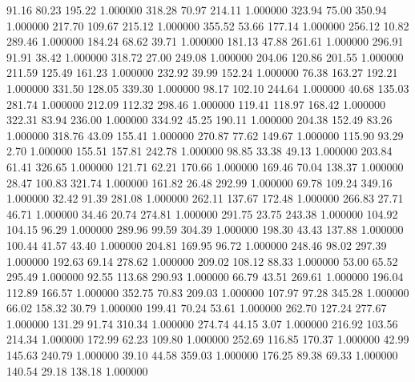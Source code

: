      91.16     80.23    195.22  1.000000
    318.28     70.97    214.11  1.000000
    323.94     75.00    350.94  1.000000
    217.70    109.67    215.12  1.000000
    355.52     53.66    177.14  1.000000
    256.12     10.82    289.46  1.000000
    184.24     68.62     39.71  1.000000
    181.13     47.88    261.61  1.000000
    296.91     91.91     38.42  1.000000
    318.72     27.00    249.08  1.000000
    204.06    120.86    201.55  1.000000
    211.59    125.49    161.23  1.000000
    232.92     39.99    152.24  1.000000
     76.38    163.27    192.21  1.000000
    331.50    128.05    339.30  1.000000
     98.17    102.10    244.64  1.000000
     40.68    135.03    281.74  1.000000
    212.09    112.32    298.46  1.000000
    119.41    118.97    168.42  1.000000
    322.31     83.94    236.00  1.000000
    334.92     45.25    190.11  1.000000
    204.38    152.49     83.26  1.000000
    318.76     43.09    155.41  1.000000
    270.87     77.62    149.67  1.000000
    115.90     93.29      2.70  1.000000
    155.51    157.81    242.78  1.000000
     98.85     33.38     49.13  1.000000
    203.84     61.41    326.65  1.000000
    121.71     62.21    170.66  1.000000
    169.46     70.04    138.37  1.000000
     28.47    100.83    321.74  1.000000
    161.82     26.48    292.99  1.000000
     69.78    109.24    349.16  1.000000
     32.42     91.39    281.08  1.000000
    262.11    137.67    172.48  1.000000
    266.83     27.71     46.71  1.000000
     34.46     20.74    274.81  1.000000
    291.75     23.75    243.38  1.000000
    104.92    104.15     96.29  1.000000
    289.96     99.59    304.39  1.000000
    198.30     43.43    137.88  1.000000
    100.44     41.57     43.40  1.000000
    204.81    169.95     96.72  1.000000
    248.46     98.02    297.39  1.000000
    192.63     69.14    278.62  1.000000
    209.02    108.12     88.33  1.000000
     53.00     65.52    295.49  1.000000
     92.55    113.68    290.93  1.000000
     66.79     43.51    269.61  1.000000
    196.04    112.89    166.57  1.000000
    352.75     70.83    209.03  1.000000
    107.97     97.28    345.28  1.000000
     66.02    158.32     30.79  1.000000
    199.41     70.24     53.61  1.000000
    262.70    127.24    277.67  1.000000
    131.29     91.74    310.34  1.000000
    274.74     44.15      3.07  1.000000
    216.92    103.56    214.34  1.000000
    172.99     62.23    109.80  1.000000
    252.69    116.85    170.37  1.000000
     42.99    145.63    240.79  1.000000
     39.10     44.58    359.03  1.000000
    176.25     89.38     69.33  1.000000
    140.54     29.18    138.18  1.000000
